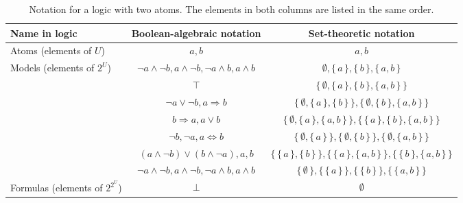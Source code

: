 \begin{sidewaystable}
  \centering
  \begin{tabular}{lcc}
    \toprule
    Name in logic & Boolean-algebraic notation & Set-theoretic notation \\
    \midrule
    Atoms (elements of $U$) & $a, b$ & $a, b$ \\
    \rowcolor{gray!25} Models (elements of $2^U$) & $\neg a \land \neg b, a \land \neg b, \neg a \land b, a \land b$ & $\emptyset, \{\, a \,\}, \{\, b \,\}, \{\, a, b \,\}$ \\
                  & $\top$ & $\{\, \emptyset, \{\, a \,\}, \{\, b \,\}, \{\, a, b \,\} \,\}$ \\
                  & $\neg a \lor \neg b, a \Rightarrow b$ & $\{\, \emptyset, \{\, a \,\}, \{\, b \,\} \,\}, \{\, \emptyset, \{\, b \,\}, \{\, a, b \,\} \,\}$ \\
                  & $b \Rightarrow a, a \lor b$ & $\{\, \emptyset, \{\, a \,\}, \{\, a, b \,\} \,\}, \{\, \{\, a \,\}, \{\, b \,\}, \{\, a, b \,\} \,\}$ \\
                  & $\neg b, \neg a, a \Leftrightarrow b$ & $\{\, \emptyset, \{\, a \,\} \,\}, \{\, \emptyset, \{\, b \,\} \,\}, \{\, \emptyset, \{\, a, b \,\} \,\}$ \\
                  & $(a \land \neg b) \lor (b \land \neg a), a, b$ & $\{\, \{\, a \,\}, \{\, b \,\} \,\}, \{\, \{\, a \,\}, \{\, a, b \,\} \,\}, \{\, \{\, b \,\}, \{\, a, b \,\} \,\}$ \\
                  & $\neg a \land \neg b, a \land \neg b, \neg a \land b, a \land b$ & $\{\, \emptyset \,\}, \{\, \{\, a \,\} \,\}, \{\, \{\, b \,\} \,\}, \{\, \{\, a, b \,\} \,\}$ \\
    \multirow{-7}{*}{Formulas (elements of $2^{2^U}$)} & $\bot$ & $\emptyset$ \\
    \bottomrule
  \end{tabular}
  \caption{Notation for a logic with two atoms. The elements in both columns are
    listed in the same order.}\label{tbl:notation_example}
\end{sidewaystable}

